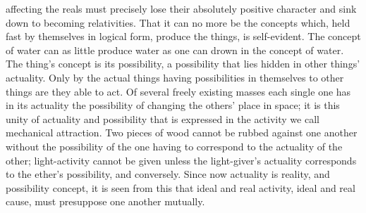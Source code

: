 \documentclass[12pt]{article}
\begin{document}
affecting the reals must precisely lose their absolutely positive character
and sink down to becoming relativities. That it can no more be the concepts
which, held fast by themselves in logical form, produce the things, is
self-evident. The concept of water can as little produce water as one can
drown in the concept of water. The thing's concept is its possibility, a
possibility that lies hidden in other things' actuality. Only by the actual
things having possibilities in themselves to other things are they able to
act. Of several freely existing masses each single one has in its actuality
the possibility of changing the others' place in space; it is this unity of
actuality and possibility that is expressed in the activity we call
mechanical attraction. Two pieces of wood cannot be rubbed against one
another without the possibility of the one having to correspond to the
actuality of the other; light-activity cannot be given unless the
light-giver's actuality corresponds to the ether's possibility, and
conversely. Since now actuality is reality, and possibility concept, it is
seen from this that ideal and real activity, ideal and real cause, must
presuppose one another mutually.
\end{document}
